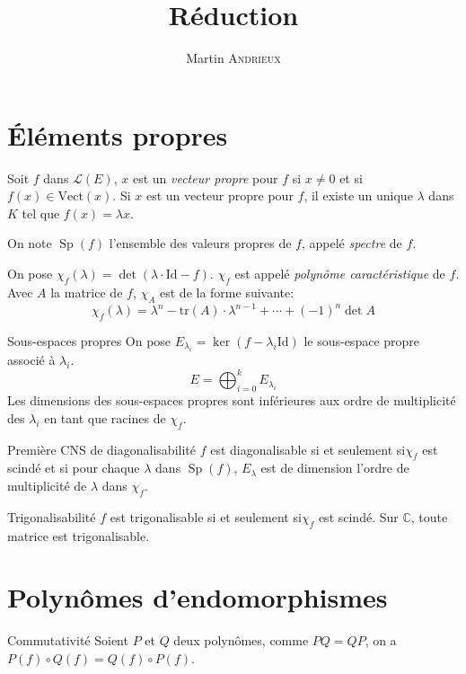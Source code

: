 \documentclass[french, a4paper, 11pt, twocolumn]{article}
\title{Réduction}
\author{Martin \textsc{Andrieux}}
\date{}
\newcommand{\ssi}{si et seulement si\xspace}		%
\DeclareMathOperator{\Sp}{Sp}
\newcommand{\C}{\mathbb{C}}   %
\newcommand{\po}{\left(}         %
\newcommand{\pf}{\right)}        %
\newcommand{\pof}[1]{\po #1 \pf} %
\begin{document}
\maketitle

\section{Éléments propres}
\begin{definition}
  Soit $f$ dans $\mathcal L(E)$, $x$ est un \emph{vecteur propre} pour $f$ si $x\neq 0$ et si $f(x)\in \mathrm{Vect}(x)$.
  Si $x$ est un vecteur propre pour $f$, il existe un unique $\lambda$ dans $K$ tel que $f(x) = \lambda x$.

  On note $\Sp(f)$ l'ensemble des valeurs propres de $f$, appelé \emph{spectre} de $f$.
\end{definition}

\begin{definition}
  On pose $\chi_{f}(\lambda) = \det\pof{\lambda\cdot\mathrm{Id} - f}$. $\chi_{f}$ est appelé \emph{polynôme caractéristique} de $f$. Avec $A$ la matrice de $f$, $\chi_{A}$ est de la forme suivante:
  \[\chi_{f}(\lambda) = \lambda^{n}-\mathrm{tr}(A)\cdot\lambda^{n-1}+\cdots+\pof{-1}^{n}\det A\]
\end{definition}

\begin{theoreme}{Sous-espaces propres}
  On pose $E_{\lambda_{i}} = \ker(f-\lambda_{i}\mathrm{Id})$ le sous-espace propre associé à $\lambda_{i}$.
  \[E = \bigoplus_{i=0}^{k}E_{\lambda_{i}}\]
  Les dimensions des sous-espaces propres sont inférieures aux ordre de multiplicité des $\lambda_{i}$ en tant que racines de $\chi_{f}$.
\end{theoreme}

\begin{theoreme}{Première CNS de diagonalisabilité}
  $f$ est diagonalisable \ssi $\chi_{f}$ est scindé et si pour chaque $\lambda$ dans $\Sp(f)$, $E_{\lambda}$ est de dimension l'ordre de multiplicité de $\lambda$ dans $\chi_{f}$.
\end{theoreme}

\begin{theoreme}{Trigonalisabilité}
  $f$ est trigonalisable \ssi $\chi_{f}$ est scindé.
  \tcblower
  Sur $\C$, toute matrice est trigonalisable.
\end{theoreme}

\section{Polynômes d'endomorphismes}
\begin{theoreme}{Commutativité}
  Soient $P$ et $Q$ deux polynômes, comme $PQ=QP$, on a $P(f)\circ Q(f)=Q(f)\circ P(f)$.
\end{theoreme}
\end{document}
